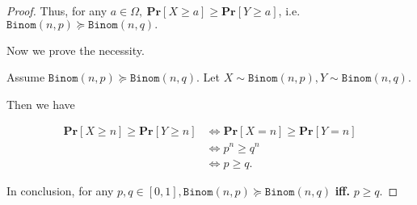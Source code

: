 \documentclass{article}
\begin{document}
\begin{proof}
\vspace{-0.75em} \hspace{1.3em}
Thus, for any $a\in\Omega,\ \mathbf{Pr}\left[X\geq a\right]\geq\mathbf{Pr}\left[Y\geq a\right]$, i.e. $\mathtt{Binom}(n,p)\succeq\mathtt{Binom}(n,q).$

\vspace{5em} \hspace{1.3em}
Now we prove the necessity.

\hspace{1.3em}
Assume $\mathtt{Binom}(n,p)\succeq\mathtt{Binom}(n,q)$. Let $X\sim\mathtt{Binom}(n,p), Y\sim\mathtt{Binom}(n,q).$ 

\hspace{1.3em}
Then we have

\vspace{-2.5em}
\begin{align*}
    \mathbf{Pr}\left[X\geq n\right]\geq\mathbf{Pr}\left[Y\geq n\right] &\Longleftrightarrow \mathbf{Pr}\left[X= n\right]\geq\mathbf{Pr}\left[Y= n\right] \\
    &\Longleftrightarrow p^n \geq q^n \\
    &\Longleftrightarrow p \geq q.
\end{align*}

\vspace{3em}
\hspace{1.3em}
In conclusion, for any $p,q\in[0,1], \mathtt{Binom}(n,p)\succeq\mathtt{Binom}(n,q)$ \textbf{iff.} $p\geq q.$
\end{proof}
\end{document}
